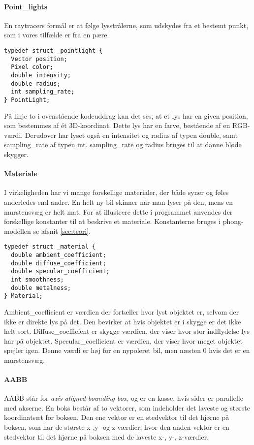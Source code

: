 \paragraph{Point\_lights}

En raytracers formål er at følge lysstrålerne, som udskydes fra et bestemt punkt, som i vores tilfælde er fra en pære. 

\begin{lstlisting}[style=Cstyle, caption=Struct til light]
typedef struct _pointlight {
  Vector position;
  Pixel color;
  double intensity;
  double radius;
  int sampling_rate;
} PointLight;
\end{lstlisting}

På linje to i ovenstående kodeuddrag kan det ses, at et lys har en given position, som bestemmes af ét 3D-koordinat. Dette lys har en farve, bestående af en RGB-værdi. Derudover har lyset også en intensitet og radius af typen double, samt sampling\_rate af typen int. sampling\_rate og radius bruges til at danne bløde skygger.

\paragraph{Materiale}
I virkeligheden har vi mange forskellige materialer, der både syner og føles anderledes end andre. En helt ny bil skinner når man lyser på den, mens en murstensvæg er helt mat. For at illustrere dette i programmet anvendes der forskellige konstanter til at beskrive et materiale. Konstanterne bruges i phong-modellen se afsnit \ref{sec:teori}.

\begin{lstlisting}[style=Cstyle, caption=Struct til Material]
typedef struct _material {
  double ambient_coefficient;
  double diffuse_coefficient;
  double specular_coefficient;
  int smoothness;
  double metalness; 
} Material;
\end{lstlisting}

Ambient\_coefficient er værdien der fortæller hvor lyst objektet er, selvom der ikke er direkte lys på det. Den bevirker at hvis objektet er i skygge er det ikke helt sort.
Diffuse\_coefficient er skygge-værdien, der viser hvor stor indflydelse lys har på objektet. 
Specular\_coefficient er værdien, der viser hvor meget objektet spejler igen. Denne værdi er høj for en nypoleret bil, men næsten 0 hvis det er en murstensvæg.

\paragraph{AABB}
AABB står for \textit{axis aligned bounding box}, og er en kasse, hvis sider er parallelle med akserne. En boks består af to vektorer, som indeholder det laveste og største koordinatsæt for boksen. Den ene vektor er en stedvektor til det hjørne på boksen, som har de største x-,y- og z-værdier, hvor den anden vektor er en stedvektor til det hjørne på boksen med de laveste x-, y-, z-værdier. 

